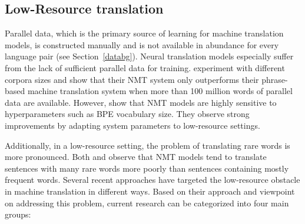 \subsection{Low-Resource translation}

Parallel data, which is the primary source of learning for machine translation models, is constructed manually and is not available in abundance for every language pair (see Section~\ref{databg}). 
Neural translation models especially suffer from the lack of sufficient parallel data for training. 
\citet{koehn2017six} experiment with different corpora sizes and show that their NMT system only outperforms their phrase-based machine translation system when more than 100 million words of parallel data are available. 
However, \citet{sennrich-zhang-2019-revisiting} show that NMT models are highly sensitive to hyperparameters such as BPE vocabulary size. They observe strong improvements by adapting system parameters to low-resource settings.  

Additionally, in a low-resource setting, the problem of translating rare words is more pronounced. 
Both \citet{sutskever2014sequence} and \citet{DBLP:journals/corr/BahdanauCB14} observe that NMT models tend to translate sentences with many rare words more poorly than sentences containing mostly frequent words.
Several recent approaches have targeted the low-resource obstacle in machine translation in different ways. 
Based on their approach and viewpoint on addressing this problem, current research can be categorized into four main groups:

